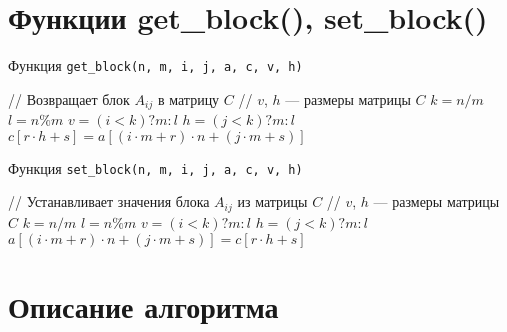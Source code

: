 \documentclass[a4paper,12pt]{article}
\begin{document}
\newpage
\section{Функции get\_block(), set\_block()}

\begin{algorithm}
\caption{Функция \texttt{get\_block(n, m, i, j, a, c, v, h)}}
\begin{algorithmic}[1]
\State // Возвращает блок $A_{ij}$ в матрицу $C$
\State // $v$, $h$ — размеры матрицы $C$
\State $k = n / m$
\State $l = n \% m$
\State $v = (i < k) ? m : l$
\State $h = (j < k) ? m : l$
        \State $c[r \cdot h + s] = a[(i \cdot m + r) \cdot n + (j \cdot m + s)]$
    \EndFor
\EndFor
\end{algorithmic}
\end{algorithm}

\begin{algorithm}
\caption{Функция \texttt{set\_block(n, m, i, j, a, c, v, h)}}
\begin{algorithmic}[1]
\State // Устанавливает значения блока $A_{ij}$ из матрицы $C$
\State // $v$, $h$ — размеры матрицы $C$
\State $k = n / m$
\State $l = n \% m$
\State $v = (i < k) ? m : l$
\State $h = (j < k) ? m : l$
        \State $a[(i \cdot m + r) \cdot n + (j \cdot m + s)] = c[r \cdot h + s]$
    \EndFor
\EndFor
\end{algorithmic}
\end{algorithm}

\newpage
\section{Описание алгоритма}
\end{document}
